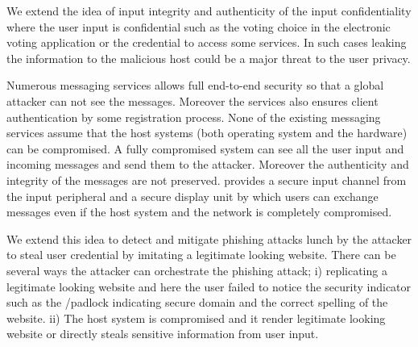 We extend the idea of input integrity and authenticity of the input confidentiality where the user input is confidential such as the voting choice in the electronic voting application or the credential to access some services. In such cases leaking the information to the malicious host could be a major threat to the user privacy. 


\iffalse
Numerous messaging services allows full end-to-end security so that a global attacker can not see the messages. Moreover the services also ensures client authentication by some registration process. None of the existing messaging services assume that the host systems (both operating system and the hardware) can be compromised. A fully compromised system can see all the user input and incoming messages and send them to the attacker. Moreover the authenticity and integrity of the messages are not preserved. \tool provides a secure input channel from the input peripheral and a secure display unit by which users can exchange messages even if the host system and the network is completely compromised.

We extend this idea to detect and mitigate phishing attacks lunch by the attacker to steal user credential by imitating a legitimate looking website. There can be several ways the attacker can orchestrate the phishing attack; i) replicating a legitimate looking website and here the user failed to notice the security indicator such as the \ssl/\tls padlock indicating secure domain and the correct spelling of the website. ii) The host system is compromised and it render legitimate looking website or directly steals sensitive information from user input.

